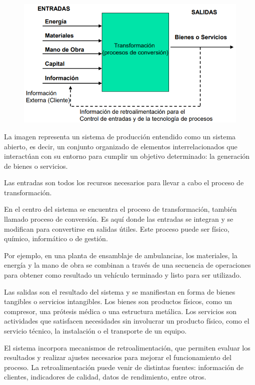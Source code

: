 \documentclass[a4paper,oneside,11pt]{article}
\begin{document}
    \begin{figure} [ht!]
        \centering
        \includegraphics[scale=0.8]{transformacion.png}
    \end{figure}
    
    La imagen representa un sistema de producción entendido como un sistema abierto, es decir, un conjunto organizado de elementos interrelacionados que interactúan con su entorno para cumplir un objetivo determinado: la generación de bienes o servicios.
    
    Las entradas son todos los recursos necesarios para llevar a cabo el proceso de transformación. 
    
    En el centro del sistema se encuentra el proceso de transformación, también llamado proceso de conversión. Es aquí donde las entradas se integran y se modifican para convertirse en salidas útiles. Este proceso puede ser físico, químico, informático o de gestión.
    
    Por ejemplo, en una planta de ensamblaje de ambulancias, los materiales, la energía y la mano de obra se combinan a través de una secuencia de operaciones para obtener como resultado un vehículo terminado y listo para ser utilizado.
    
    Las salidas son el resultado del sistema y se manifiestan en forma de bienes tangibles o servicios intangibles. Los bienes son productos físicos, como un compresor, una prótesis médica o una estructura metálica. Los servicios son actividades que satisfacen necesidades sin involucrar un producto físico, como el servicio técnico, la instalación o el transporte de un equipo.
    
    El sistema incorpora mecanismos de retroalimentación, que permiten evaluar los resultados y realizar ajustes necesarios para mejorar el funcionamiento del proceso. La retroalimentación puede venir de distintas fuentes: información de clientes, indicadores de calidad, datos de rendimiento, entre otros.
    
\end{document}
